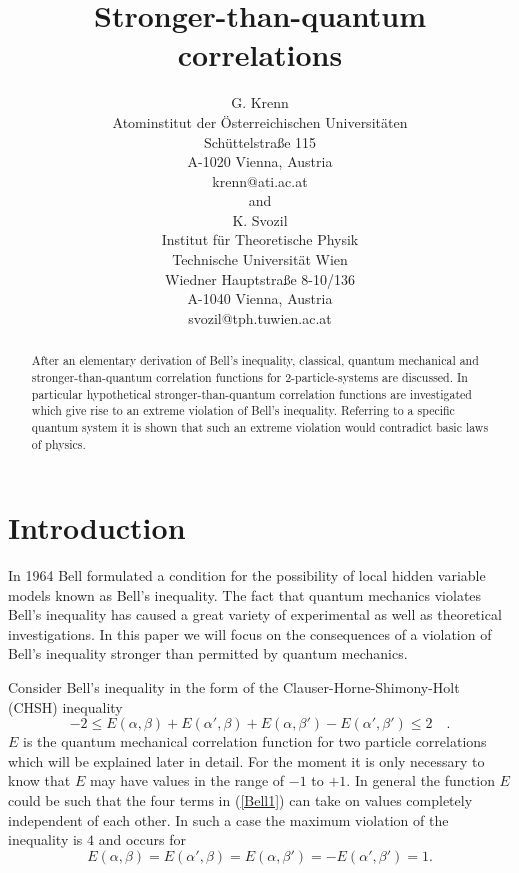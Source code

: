 
 \title{Stronger-than-quantum correlations}
\author{G. Krenn\\
 {\small Atominstitut der \"Osterreichischen Universit\"aten}  \\
  {\small Sch\"uttelstra\ss e 115}    \\
  {\small A-1020 Vienna, Austria   }            \\
  {\small krenn@ati.ac.at}   \\
{\small and}\\
K. Svozil\\
 {\small Institut f\"ur Theoretische Physik}  \\
  {\small Technische Universit\"at Wien   }     \\
  {\small Wiedner Hauptstra\ss e 8-10/136}    \\
  {\small A-1040 Vienna, Austria   }            \\
  {\small svozil@tph.tuwien.ac.at}}
\date{}
\maketitle

\begin{abstract}
After an elementary derivation of Bell's inequality, classical,
quantum mechanical and stronger-than-quantum correlation functions
for 2-particle-systems are discussed.
In particular hypothetical stronger-than-quantum
correlation functions are investigated which give rise to an extreme
violation of Bell's inequality.
Referring to a specific quantum system it is shown that such an extreme
violation would contradict basic laws of physics.
\end{abstract}

\section{Introduction}
In 1964 Bell formulated a condition for the possibility of local
hidden variable models \cite{bell} known as Bell\rq s inequality.
The fact that quantum mechanics violates Bell\rq s inequality has caused
a great variety of experimental as well as theoretical investigations.
In this paper we will focus on the consequences of a violation of
Bell\rq s inequality stronger than permitted by quantum mechanics.

Consider
 Bell\rq s inequality in the form of the
Clauser-Horne-Shimony-Holt (CHSH) inequality \cite{chsh,clauser}
\begin{equation}
-2 \le E(\alpha ,\beta )+
E(\alpha ',\beta )+
E(\alpha ,\beta ') -
E(\alpha ',\beta ')\le 2 \quad .
\label{Bell1}
\end{equation}
$E$ is the quantum mechanical correlation function for two particle
correlations which will be explained later in detail.
For the moment it is only
necessary to know that $E$ may have values in the range of $-1$ to $+1$.
In general the function $E$ could be such that the four terms in
(\ref{Bell1}) can take on values completely independent of each other.
In such a case the maximum violation of the inequality is $4$ and occurs
for
\[
E(\alpha ,\beta )=E(\alpha ',\beta )=E(\alpha ,\beta ')=
-E(\alpha ',\beta ')=1.
\]

